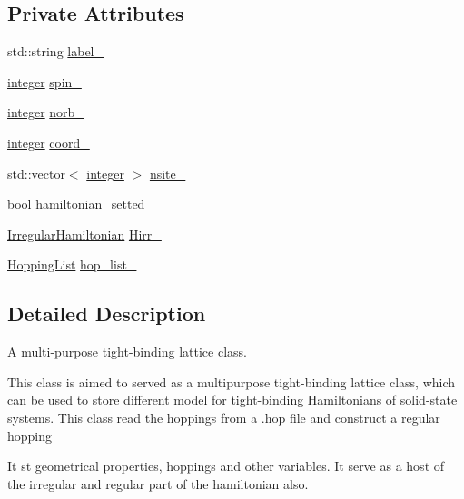 \subsection*{Private Attributes}
\begin{DoxyCompactItemize}
\item 
std\+::string \hyperlink{classNumCal_1_1Lattice_a60a503c33b250c2027631074e5ab056b}{label\+\_\+}
\item 
\hyperlink{namespaceNumCal_ae1031b42812e871d8f5bd9b7b15fc7d8}{integer} \hyperlink{classNumCal_1_1Lattice_a9fad149348681fccd17f2b714d18a329}{spin\+\_\+}
\item 
\hyperlink{namespaceNumCal_ae1031b42812e871d8f5bd9b7b15fc7d8}{integer} \hyperlink{classNumCal_1_1Lattice_a97e5bc1dcbe0fa95bd53fa24136196e1}{norb\+\_\+}
\item 
\hyperlink{namespaceNumCal_ae1031b42812e871d8f5bd9b7b15fc7d8}{integer} \hyperlink{classNumCal_1_1Lattice_a937648512bc88fd0376691695ba5ba4e}{coord\+\_\+}
\item 
std\+::vector$<$ \hyperlink{namespaceNumCal_ae1031b42812e871d8f5bd9b7b15fc7d8}{integer} $>$ \hyperlink{classNumCal_1_1Lattice_a19d0ca05d4b275d95e174b31e4ed1ae9}{nsite\+\_\+}
\item 
bool \hyperlink{classNumCal_1_1Lattice_a0df17f2217a05e898cd5266f13870238}{hamiltonian\+\_\+setted\+\_\+}
\item 
\hyperlink{classIrregularHamiltonian}{Irregular\+Hamiltonian} \hyperlink{classNumCal_1_1Lattice_a552a40694e5723cb1f96c810457f112b}{Hirr\+\_\+}
\item 
\hyperlink{classHoppingList}{Hopping\+List} \hyperlink{classNumCal_1_1Lattice_a27444d56d3a84b86396d99745259f748}{hop\+\_\+list\+\_\+}
\end{DoxyCompactItemize}


\subsection{Detailed Description}
A multi-\/purpose tight-\/binding lattice class. 

This class is aimed to served as a multipurpose tight-\/binding lattice class, which can be used to store different model for tight-\/binding Hamiltonians of solid-\/state systems. This class read the hoppings from a .hop file and construct a regular hopping

It st geometrical properties, hoppings and other variables. It serve as a host of the irregular and regular part of the hamiltonian also.

